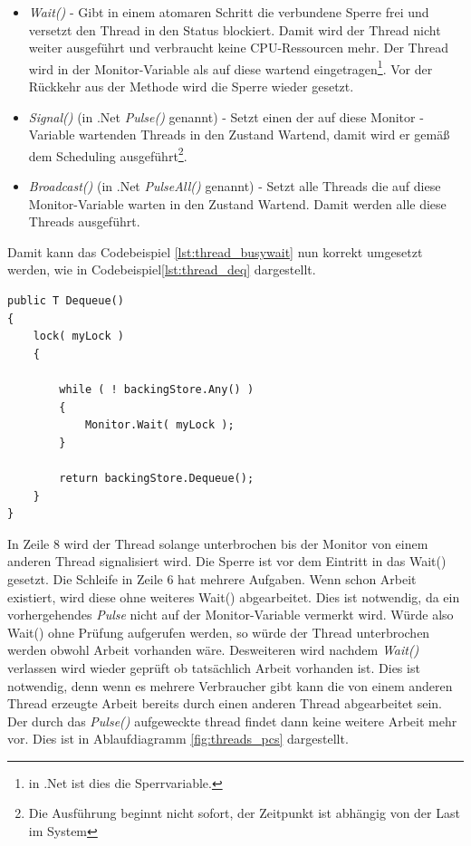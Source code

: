 \begin{itemize}
	\item \textit{Wait()} - Gibt in einem atomaren Schritt die verbundene Sperre frei und versetzt den Thread in den Status blockiert. Damit wird der Thread nicht weiter ausgeführt und verbraucht keine CPU-Ressourcen mehr. Der Thread wird in der Monitor-Variable als auf diese wartend eingetragen\footnote{in .Net ist dies die Sperrvariable.}. Vor der Rückkehr aus der Methode wird die Sperre wieder gesetzt.
	\item \textit{Signal()} (in .Net \textit{Pulse()} genannt) - Setzt einen der auf diese Monitor -Variable wartenden Threads in den Zustand Wartend, damit wird er gemäß dem Scheduling ausgeführt\footnote{Die Ausführung beginnt nicht sofort, der Zeitpunkt ist abhängig von der Last im System}.
	\item \textit{Broadcast()} (in .Net \textit{PulseAll()} genannt) - Setzt alle Threads die auf diese Monitor-Variable warten in den Zustand Wartend. Damit werden alle diese Threads ausgeführt.
\end{itemize}
 Damit kann das Codebeispiel \ref{lst:thread_busywait} nun korrekt umgesetzt werden, wie in Codebeispiel\ref{lst:thread_deq} dargestellt.
\begin{lstlisting}[caption={Thread Monitor.Wait()},label={lst:thread_deq},captionpos=b]
public T Dequeue()
{
	lock( myLock )
	{

		while ( ! backingStore.Any() )
		{
			Monitor.Wait( myLock );
		}

		return backingStore.Dequeue();
	}
}
\end{lstlisting}
In Zeile 8 wird der Thread solange unterbrochen bis der Monitor von einem anderen Thread signalisiert wird. Die Sperre ist vor dem Eintritt in das Wait() gesetzt. Die Schleife in Zeile 6 hat mehrere Aufgaben. Wenn schon Arbeit existiert, wird diese ohne weiteres Wait() abgearbeitet. Dies ist notwendig, da ein vorhergehendes \textit{Pulse} nicht auf der Monitor-Variable vermerkt wird. Würde also Wait() ohne Prüfung aufgerufen werden, so würde der Thread unterbrochen werden obwohl Arbeit vorhanden wäre. Desweiteren wird nachdem \textit{Wait()} verlassen wird wieder geprüft ob tatsächlich Arbeit vorhanden ist. Dies ist notwendig, denn wenn es mehrere Verbraucher gibt kann die von einem anderen Thread erzeugte Arbeit bereits durch einen anderen Thread abgearbeitet sein. Der durch das \textit{Pulse()} aufgeweckte thread findet dann keine weitere Arbeit mehr vor. Dies ist in Ablaufdiagramm \ref{fig:threads_pcs} dargestellt.

